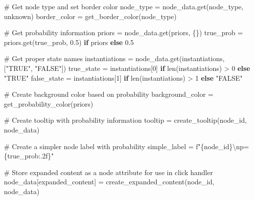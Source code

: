 \documentclass[
  11pt,
  letterpaper,
]{book}
\newenvironment{Shaded}{\begin{snugshade}}{\end{snugshade}}
\newcommand{\BuiltInTok}[1]{\textcolor[rgb]{0.00,0.23,0.31}{#1}}
\newcommand{\CharTok}[1]{\textcolor[rgb]{0.13,0.47,0.30}{#1}}
\newcommand{\CommentTok}[1]{\textcolor[rgb]{0.37,0.37,0.37}{#1}}
\newcommand{\ControlFlowTok}[1]{\textcolor[rgb]{0.00,0.23,0.31}{\textbf{#1}}}
\newcommand{\DecValTok}[1]{\textcolor[rgb]{0.68,0.00,0.00}{#1}}
\newcommand{\FloatTok}[1]{\textcolor[rgb]{0.68,0.00,0.00}{#1}}
\newcommand{\NormalTok}[1]{\textcolor[rgb]{0.00,0.23,0.31}{#1}}
\newcommand{\OperatorTok}[1]{\textcolor[rgb]{0.37,0.37,0.37}{#1}}
\newcommand{\SpecialCharTok}[1]{\textcolor[rgb]{0.37,0.37,0.37}{#1}}
\newcommand{\SpecialStringTok}[1]{\textcolor[rgb]{0.13,0.47,0.30}{#1}}
\newcommand{\StringTok}[1]{\textcolor[rgb]{0.13,0.47,0.30}{#1}}
\begin{document}
\begin{landscape}
\begin{Shaded}
\begin{Highlighting}[]
        \CommentTok{\# Get node type and set border color}
\NormalTok{        node\_type }\OperatorTok{=}\NormalTok{ node\_data.get(}\StringTok{\textquotesingle{}node\_type\textquotesingle{}}\NormalTok{, }\StringTok{\textquotesingle{}unknown\textquotesingle{}}\NormalTok{)}
\NormalTok{        border\_color }\OperatorTok{=}\NormalTok{ get\_border\_color(node\_type)}

        \CommentTok{\# Get probability information}
\NormalTok{        priors }\OperatorTok{=}\NormalTok{ node\_data.get(}\StringTok{\textquotesingle{}priors\textquotesingle{}}\NormalTok{, \{\})}
\NormalTok{        true\_prob }\OperatorTok{=}\NormalTok{ priors.get(}\StringTok{\textquotesingle{}true\_prob\textquotesingle{}}\NormalTok{, }\FloatTok{0.5}\NormalTok{) }\ControlFlowTok{if}\NormalTok{ priors }\ControlFlowTok{else} \FloatTok{0.5}

        \CommentTok{\# Get proper state names}
\NormalTok{        instantiations }\OperatorTok{=}\NormalTok{ node\_data.get(}\StringTok{\textquotesingle{}instantiations\textquotesingle{}}\NormalTok{, [}\StringTok{"TRUE"}\NormalTok{, }\StringTok{"FALSE"}\NormalTok{])}
\NormalTok{        true\_state }\OperatorTok{=}\NormalTok{ instantiations[}\DecValTok{0}\NormalTok{] }\ControlFlowTok{if} \BuiltInTok{len}\NormalTok{(instantiations) }\OperatorTok{\textgreater{}} \DecValTok{0} \ControlFlowTok{else} \StringTok{"TRUE"}
\NormalTok{        false\_state }\OperatorTok{=}\NormalTok{ instantiations[}\DecValTok{1}\NormalTok{] }\ControlFlowTok{if} \BuiltInTok{len}\NormalTok{(instantiations) }\OperatorTok{\textgreater{}} \DecValTok{1} \ControlFlowTok{else} \StringTok{"FALSE"}

        \CommentTok{\# Create background color based on probability}
\NormalTok{        background\_color }\OperatorTok{=}\NormalTok{ get\_probability\_color(priors)}

        \CommentTok{\# Create tooltip with probability information}
\NormalTok{        tooltip }\OperatorTok{=}\NormalTok{ create\_tooltip(node\_id, node\_data)}

        \CommentTok{\# Create a simpler node label with probability}
\NormalTok{        simple\_label }\OperatorTok{=} \SpecialStringTok{f"}\SpecialCharTok{\{}\NormalTok{node\_id}\SpecialCharTok{\}}\CharTok{\textbackslash{}n}\SpecialStringTok{p=}\SpecialCharTok{\{}\NormalTok{true\_prob}\SpecialCharTok{:.2f\}}\SpecialStringTok{"}

        \CommentTok{\# Store expanded content as a node attribute for use in click handler}
\NormalTok{        node\_data[}\StringTok{\textquotesingle{}expanded\_content\textquotesingle{}}\NormalTok{] }\OperatorTok{=}\NormalTok{ create\_expanded\_content(node\_id, node\_data)}


\end{Highlighting}
\end{Shaded}
\end{landscape}
\end{document}
